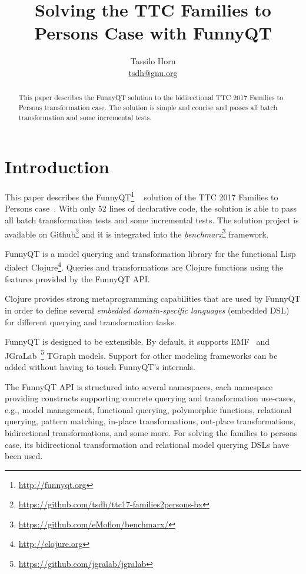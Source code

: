 \documentclass[a4paper]{article}
\title{Solving the TTC Families to Persons Case with FunnyQT}
\author{Tassilo Horn\\ \href{mailto:tsdh@gnu.org}{tsdh@gnu.org}}
\begin{document}
\maketitle

\begin{abstract}
  This paper describes the FunnyQT solution to the bidirectional TTC 2017
  Families to Persons transformation case.  The solution is simple and concise
  and passes all batch transformation and some incremental tests.
\end{abstract}


\section{Introduction}
\label{sec:introduction}

This paper describes the FunnyQT\footnote{\url{http://funnyqt.org}}
~\cite{diss,funnyqt-icgt15} solution of the TTC 2017 Families to Persons
case~\cite{f2p-case-desc}.  With only 52 lines of declarative code, the
solution is able to pass all batch transformation tests and some incremental
tests.  The solution project is available on
Github\footnote{\url{https://github.com/tsdh/ttc17-families2persons-bx}} and it
is integrated into the
\emph{benchmarx}\footnote{\url{https://github.com/eMoflon/benchmarx/}}
framework.

FunnyQT is a model querying and transformation library for the functional Lisp
dialect Clojure\footnote{\url{http://clojure.org}}.  Queries and
transformations are Clojure functions using the features provided by the
FunnyQT API.

Clojure provides strong metaprogramming capabilities that are used by FunnyQT
in order to define several \emph{embedded domain-specific languages} (embedded
DSL\cite{book:Fowler2010DSL}) for different querying and transformation tasks.

FunnyQT is designed to be extensible.  By default, it supports
EMF~\cite{Steinberg2008EEM} and
JGraLab~\footnote{\url{https://github.com/jgralab/jgralab}} TGraph models.
Support for other modeling frameworks can be added without having to touch
FunnyQT's internals.

The FunnyQT API is structured into several namespaces, each namespace providing
constructs supporting concrete querying and transformation use-cases, e.g.,
model management, functional querying, polymorphic functions, relational
querying, pattern matching, in-place transformations, out-place
transformations, bidirectional transformations, and some more.  For solving the
families to persons case, its bidirectional transformation and relational model
querying DSLs have been used.
\end{document}
